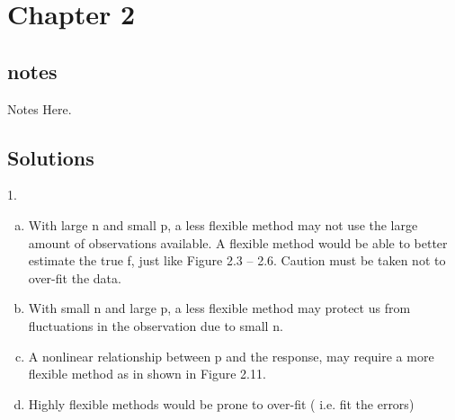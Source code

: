 \documentclass[12pt,twoside,notitlepage]{article}
\begin{document}
\section{Chapter 2}

\subsection{notes}

Notes Here.

\subsection{Solutions}
\setdefaultleftmargin{30pt}{}{}{}{}{}
1.


\begin{enumerate}[(a)]
\setlength\itemindent{20pt}
\item With large n and small p, a less flexible method may not use the large 
  amount of observations available. A flexible method would be able to better 
  estimate the true f, just like Figure 2.3 -- 2.6. Caution must be taken not 
  to over-fit the data.
\item With small n and large p, a less flexible method may protect us from 
fluctuations in the observation due to small n. 
\item A nonlinear relationship between p and the response, may require a more 
  flexible method as in shown in Figure 2.11.
\item Highly flexible methods would be prone to over-fit ( i.e. fit the errors) 
\end{enumerate}
\end{document}
